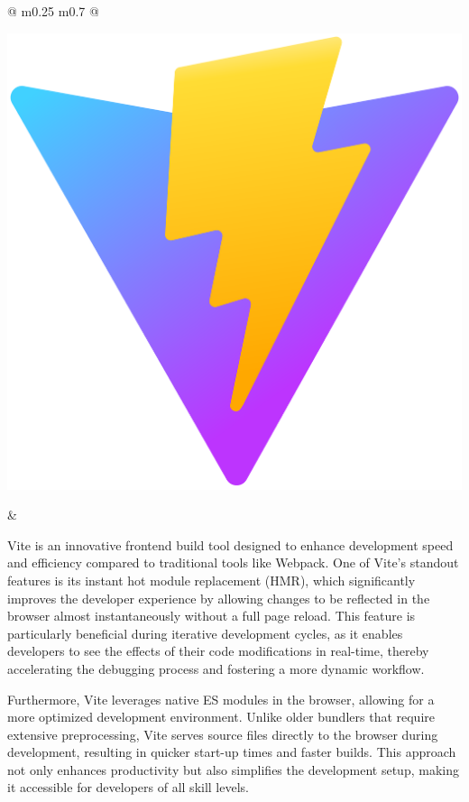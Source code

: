 	
	\vspace*{0.5 cm}
	
	\begin{tabular}{ @{} m{0.25\textwidth} m{0.7\textwidth} @{} }
		\begin{minipage}{\linewidth}
			\centering
			\includegraphics[width=0.45\linewidth]{graphics/vite.png}
			\label{fig:vite}
		\end{minipage}
		&
		\begin{minipage}{\linewidth}			
			Vite is an innovative frontend build tool designed to enhance development speed and efficiency compared to traditional tools like Webpack. One of Vite's standout features is its instant hot module replacement (HMR), which significantly improves the developer experience by allowing changes to be reflected in the browser almost instantaneously without a full page reload. This feature is particularly beneficial during iterative development cycles, as it enables developers to see the effects of their code modifications in real-time, thereby accelerating the debugging process and fostering a more dynamic workflow. \cite{vite} 
			
			Furthermore, Vite leverages native ES modules in the browser, allowing for a more optimized development environment. Unlike older bundlers that require extensive preprocessing, Vite serves source files directly to the browser during development, resulting in quicker start-up times and faster builds. This approach not only enhances productivity but also simplifies the development setup, making it accessible for developers of all skill levels. \cite{why-vite}
			
		\end{minipage}
	\end{tabular}
	
